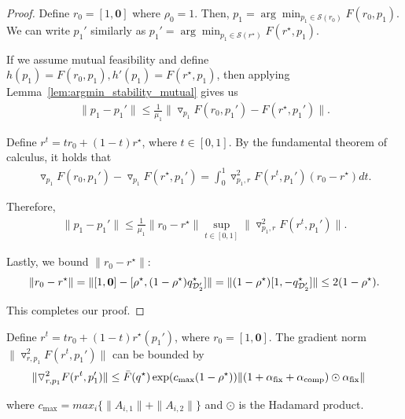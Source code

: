 \begin{proof}
    Define $r_0 = [1, \mathbf{0}]$ where $\rho_0 = 1$. Then, $p_1 = \arg \min_{p_1 \in \mathcal{S}(r_0)} F(r_0, p_1)$. We can write $p_1'$ similarly as $p_1' = \arg \min_{p_1 \in \mathcal{S}(r^\star)} F(r^\star, p_1)$. 

    If we assume mutual feasibility and define $h(p_1) = F(r_0, p_1), h'(p_1) = F(r^\star, p_1)$, then applying Lemma~\ref{lem:argmin_stability_mutual} gives us
    \begin{align*}
        \| p_1 - p_1' \| \le \frac{1}{\mu_1} \|\triangledown_{p_1} F(r_0, p_1') - F(r^\star, p_1') \|.
    \end{align*}

    Define $r^t = t r_0 + (1 - t) r^\star$, where $t \in [0, 1]$. By the fundamental theorem of calculus, it holds that 
    \begin{align*}
        \triangledown_{p_1} F(r_0, p_1') - \triangledown_{p_1} F(r^\star, p_1') = \int_0^1 \triangledown_{p_1, r}^2 F(r^t, p_1') (r_0 - r^\star) dt.
    \end{align*}

    Therefore, 
    \begin{align*}
        \| p_1 - p_1' \| \le \frac{1}{\mu_1} \|r_0 - r^\star \| \sup_{t \in [0, 1]}  \| \triangledown_{p_1, r}^2 F(r^t, p_1') \|.
    \end{align*}

    Lastly, we bound $\|r_0 - r^\star\|$:
    \begin{align*}
        \|r_0 - r^\star\| = \|[1, \mathbf{0}] - [\rho^\star, (1 - \rho^\star) q_{\mathcal{D}_2'}^\star] \| = \| (1 - \rho^\star) [1, -q_{\mathcal{D}_2'}^\star]\| \le 2(1 - \rho^\star).
    \end{align*}

    This completes our proof.
\end{proof}

\begin{lemma}\label{lemma:grad_r_p1_add}
    Define $r^t = t r_0 + (1 - t) r^\star(p_1')$, where $r_0 = [1, \mathbf{0}]$.
    The gradient norm $\|\triangledown^2_{r,p_1}F(r^t,p_1')\|$ can be bounded by 
    \begin{align*}
       \|\triangledown^2_{r,p_1}F(r^t,p_1')\| &\le \bar{F}(q^\star) \exp( c_{\max}(1 - \rho^\star)) \|(1 + \alpha_{\text{fix}} + \alpha_{\text{comp}}) \odot \alpha_{\text{fix}} \|
    \end{align*}
    
    where $c_{\max} = max_i \{\|A_{i, 1}\| + \|A_{i, 2}\| \}$ and $\odot$ is the Hadamard product. 
\end{lemma}


